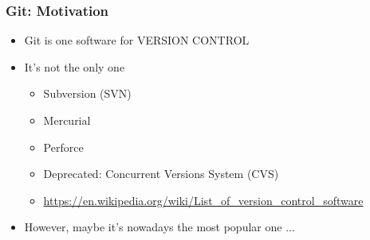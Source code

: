 \documentclass{beamer} %
\begin{document}
\begin{frame}[t]
\frametitle{Git: Motivation}
\begin{itemize}
    \setlength\itemsep{1em}
	\item Git is one software for VERSION CONTROL \newline
    \item It's not the only one
    
	\begin{itemize}
    	\setlength\itemsep{0.4em}
		\item Subversion (SVN)
        \item Mercurial
        \item Perforce 
        \item Deprecated: Concurrent Versions System (CVS)
        \item \href{https://en.wikipedia.org/wiki/List_of_version_control_software}{https://en.wikipedia.org/wiki/List\_of\_version\_control\_software} 
	\end{itemize}
    
    \item However, maybe it's nowadays the most popular one ...
    
\end{itemize}
\end{frame}
\end{document}
